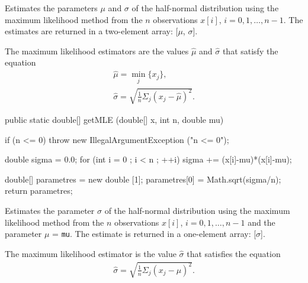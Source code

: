 \begin{tabb}
   Estimates the parameters $\mu$ and $\sigma$ of the half-normal distribution
   using the maximum likelihood method from the $n$ observations
   $x[i]$, $i = 0, 1, \ldots, n-1$. The estimates are returned in a two-element
    array: [$\mu$, $\sigma$].
   \begin{detailed}
   The maximum likelihood estimators are the values
   $\hat{\mu}$ and $\hat{\sigma}$ that satisfy the equation
   \begin{eqnarray*}
     \hat \mu =  \min_j \{x_j\}, \\[6pt]
     \hat \sigma = \sqrt{\frac{1}{n}\Sigma_j(x_j-\hat{\mu})^2}.
   \end{eqnarray*}
   \end{detailed}
\end{tabb}
\begin{htmlonly}
\end{htmlonly}
\begin{code}

   public static double[] getMLE (double[] x, int n, double mu)\begin{hide} {
      if (n <= 0)
         throw new IllegalArgumentException ("n <= 0");

      double sigma = 0.0;
      for (int i = 0 ; i < n ; ++i)
         sigma += (x[i]-mu)*(x[i]-mu);

      double[] parametres = new double [1];
      parametres[0] = Math.sqrt(sigma/n);
      return parametres;
   }\end{hide}
\end{code}
\begin{tabb}
   Estimates the parameter $\sigma$ of the half-normal distribution using the
   maximum likelihood method from the $n$ observations $x[i]$, $i = 0, 1,
   \ldots, n-1$ and the parameter $\mu$ = \texttt{mu}. The estimate is
   returned in a one-element array: [$\sigma$].
   \begin{detailed}
   The maximum likelihood estimator is the value
   $\hat{\sigma}$ that satisfies the equation
   \begin{eqnarray*}
     \hat \sigma = \sqrt{\frac{1}{n}\Sigma_j(x_j-\mu)^2}.
   \end{eqnarray*}
   \end{detailed}
\end{tabb}
